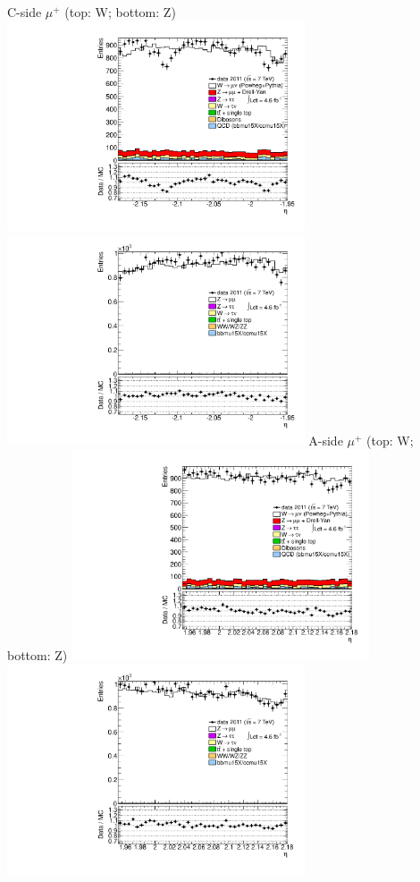  {
\colb[T]
C-side $\mu^{+}$ (top: W; bottom: Z)
\centering
\includegraphics[width=0.66\textwidth]{dates/20130306/figures/etaphi/WpItoI_10_C_stack_l_eta_POS} \\
\includegraphics[width=0.66\textwidth]{dates/20130306/figures/etaphi/Z_10_C_stack_lP_eta_ALL.pdf}
A-side $\mu^{+}$ (top: W; bottom: Z)
\centering
\includegraphics[width=0.66\textwidth]{dates/20130306/figures/etaphi/WpItoI_10_A_stack_l_eta_POS} \\
\includegraphics[width=0.66\textwidth]{dates/20130306/figures/etaphi/Z_10_A_stack_lP_eta_ALL.pdf} 
\cole
}



